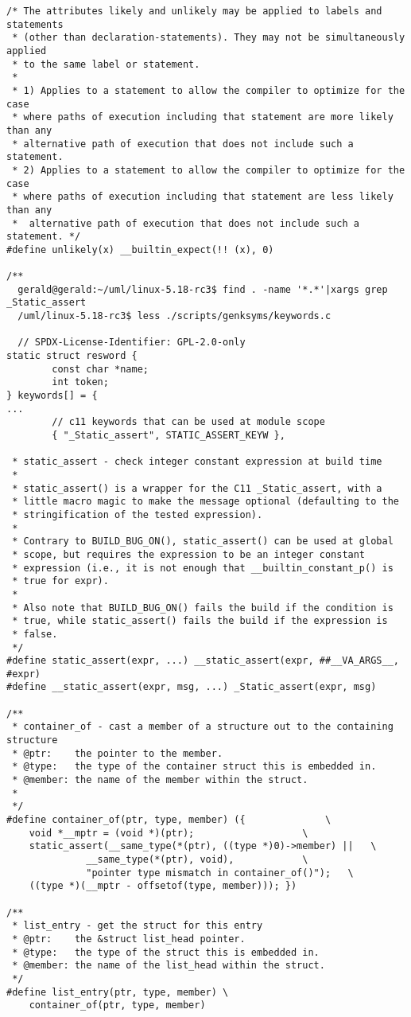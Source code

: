 \documentclass{article}
\begin{document}
\begin{lstlisting}[style=CStyle]
/* The attributes likely and unlikely may be applied to labels and statements
 * (other than declaration-statements). They may not be simultaneously applied
 * to the same label or statement.
 *
 * 1) Applies to a statement to allow the compiler to optimize for the case
 * where paths of execution including that statement are more likely than any
 * alternative path of execution that does not include such a statement.
 * 2) Applies to a statement to allow the compiler to optimize for the case
 * where paths of execution including that statement are less likely than any
 *  alternative path of execution that does not include such a statement. */
#define unlikely(x)	__builtin_expect(!! (x), 0)

/**
  gerald@gerald:~/uml/linux-5.18-rc3$ find . -name '*.*'|xargs grep _Static_assert
  /uml/linux-5.18-rc3$ less ./scripts/genksyms/keywords.c
  
  // SPDX-License-Identifier: GPL-2.0-only
static struct resword {
        const char *name;
        int token;
} keywords[] = {
...
        // c11 keywords that can be used at module scope
        { "_Static_assert", STATIC_ASSERT_KEYW },

 * static_assert - check integer constant expression at build time
 *
 * static_assert() is a wrapper for the C11 _Static_assert, with a
 * little macro magic to make the message optional (defaulting to the
 * stringification of the tested expression).
 *
 * Contrary to BUILD_BUG_ON(), static_assert() can be used at global
 * scope, but requires the expression to be an integer constant
 * expression (i.e., it is not enough that __builtin_constant_p() is
 * true for expr).
 *
 * Also note that BUILD_BUG_ON() fails the build if the condition is
 * true, while static_assert() fails the build if the expression is
 * false.
 */
#define static_assert(expr, ...) __static_assert(expr, ##__VA_ARGS__, #expr)
#define __static_assert(expr, msg, ...) _Static_assert(expr, msg)

/**
 * container_of - cast a member of a structure out to the containing structure
 * @ptr:	the pointer to the member.
 * @type:	the type of the container struct this is embedded in.
 * @member:	the name of the member within the struct.
 *
 */
#define container_of(ptr, type, member) ({				\
	void *__mptr = (void *)(ptr);					\
	static_assert(__same_type(*(ptr), ((type *)0)->member) ||	\
		      __same_type(*(ptr), void),			\
		      "pointer type mismatch in container_of()");	\
	((type *)(__mptr - offsetof(type, member))); })

/**
 * list_entry - get the struct for this entry
 * @ptr:	the &struct list_head pointer.
 * @type:	the type of the struct this is embedded in.
 * @member:	the name of the list_head within the struct.
 */
#define list_entry(ptr, type, member) \
	container_of(ptr, type, member)


\end{lstlisting}
\end{document}

